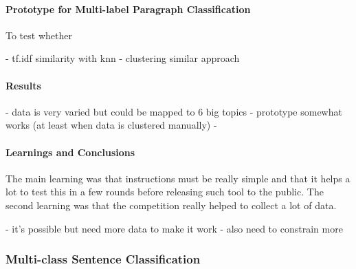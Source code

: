 \paragraph{Prototype for Multi-label Paragraph Classification}
\label{par:Prototype for Multi-label Paragraph Classification}

To test whether

- tf.idf similarity with knn
- clustering similar approach

\paragraph{Results}
\label{par:Results}

- data is very varied but could be mapped to 6 big topics
- prototype somewhat works (at least when data is clustered manually)
- 

\paragraph{Learnings and Conclusions}
\label{par:Learnings and Conclusions}

The main learning was that instructions must be really simple and that it helps a lot to test this in a few rounds before releasing such tool to the public. The second learning was that the competition really helped to collect a lot of data.

- it's possible but need more data to make it work
- also need to constrain more



\subsubsection{Multi-class Sentence Classification}
\label{subs:Multi-class Sentence Classification}





